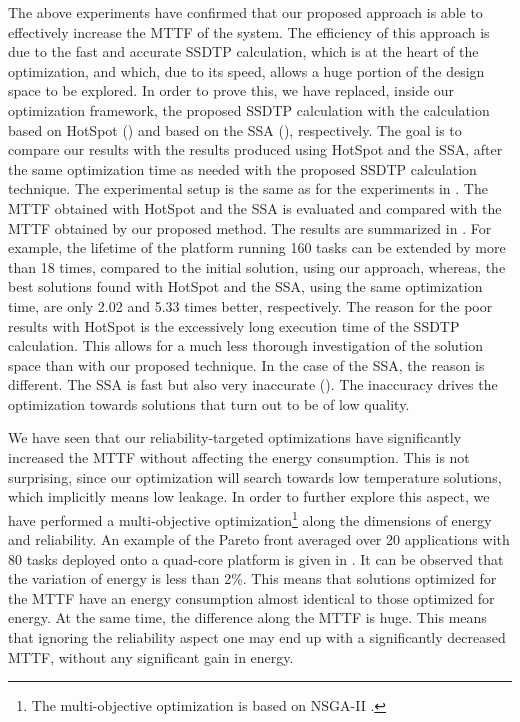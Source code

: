The above experiments have confirmed that our proposed approach is able to effectively increase the MTTF of the system. The efficiency of this approach is due to the fast and accurate SSDTP calculation, which is at the heart of the optimization, and which, due to its speed, allows a huge portion of the design space to be explored. In order to prove this, we have replaced, inside our optimization framework, the proposed SSDTP calculation with the calculation based on HotSpot () and based on the SSA (), respectively. The goal is to compare our results with the results produced using HotSpot and the SSA, after the same optimization time as needed with the proposed SSDTP calculation technique. The experimental setup is the same as for the experiments in . The MTTF obtained with HotSpot and the SSA is evaluated and compared with the MTTF obtained by our proposed method. The results are summarized in . For example, the lifetime of the platform running 160 tasks can be extended by more than 18 times, compared to the initial solution, using our approach, whereas, the best solutions found with HotSpot and the SSA, using the same optimization time, are only 2.02 and 5.33 times better, respectively. The reason for the poor results with HotSpot is the excessively long execution time of the SSDTP calculation. This allows for a much less thorough investigation of the solution space than with our proposed technique. In the case of the SSA, the reason is different. The SSA is fast but also very inaccurate (). The inaccuracy drives the optimization towards solutions that turn out to be of low quality.

We have seen that our reliability-targeted optimizations have significantly increased the MTTF without affecting the energy consumption. This is not surprising, since our optimization will search towards low temperature solutions, which implicitly means low leakage. In order to further explore this aspect, we have performed a multi-objective optimization\footnote{The multi-objective optimization is based on NSGA-II \cite{deb2002}.} along the dimensions of energy and reliability. An example of the Pareto front averaged over 20 applications with 80 tasks deployed onto a quad-core platform is given in . It can be observed that the variation of energy is less than 2\%. This means that solutions optimized for the MTTF have an energy consumption almost identical to those optimized for energy. At the same time, the difference along the MTTF is huge. This means that ignoring the reliability aspect one may end up with a significantly decreased MTTF, without any significant gain in energy.

